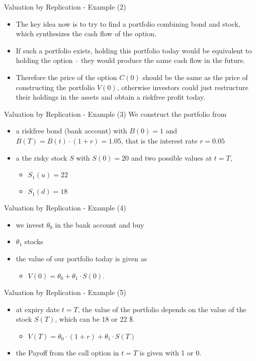{Valuation by Replication - Example (2)}
\begin{itemize}
  \item The key idea now is to try to find a portfolio combining bond and
stock, which synthesizes the cash flow of the option.
\item If such a portfolio exists, holding this portfolio today would be equivalent
to holding the option -- they would produce the same cash flow in
the future.
\item Therefore the price of the option $C(0)$ should be the same
as the price of constructing the portfolio $V(0)$, otherwise investors
could just restructure their holdings in the assets and obtain a
riskfree profit today.
\end{itemize}



{Valuation by Replication - Example (3)}
We construct the portfolio from
\begin{itemize}
\item a riskfree bond (bank account) with $B(0)=1$ and $B(T)=B(t) \cdot (1+r) = 1.05$,
that is the interest rate $r=0.05$
\item a the risky stock $S$ with $S(0) = 20$ and two
possible values at $t=T$,
\begin{itemize}
\item $S_1(u)=22$
\item $S_1(d)=18$
\end{itemize}
\end{itemize}




{Valuation by Replication - Example (4)}
\begin{itemize}
  \item we invest $\theta_0$ in the bank account and buy
  \item $\theta_1$ stocks
  \item the value of our portfolio today is given as
  \begin{itemize}
    \item $V(0) = \theta_0 + \theta_1 \cdot S(0)$.
  \end{itemize}
\end{itemize}



{Valuation by Replication - Example (5)}
\begin{itemize}
  \item at expiry date $t=T$, the value of the portfolio depends on the value of the stock $S(T)$, which can be 18 or 22 $\$$.
  \begin{itemize}
    \item $V(T) = \theta_0 \cdot (1+r) + \theta_1 \cdot S(T)$
  \end{itemize}
  \item the Payoff from the call option in $t=T$ is given with 1 or 0.
 \end{itemize}



